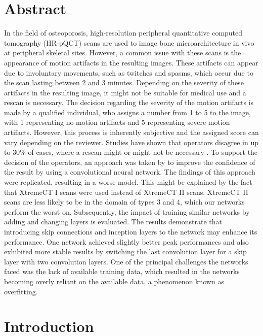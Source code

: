 \documentclass[
a4paper, 
12pt,
grayscalebody, %
abstract=on,
twoside, BCOR10mm, 12pt, DIV13,headinclude, footexclude, final, abstracton, openright
]{ibireprt}
\numberwithin{equation}{chapter}
\numberwithin{table}{chapter}
\numberwithin{figure}{chapter}
\numberwithin{algorithm}{chapter}
\numberwithin{example}{chapter}
\numberwithin{example}{chapter}
\begin{document}
\chapter*{Abstract}
In the field of osteoporosis, high-resolution peripheral quantitative computed tomography (HR-pQCT) scans are used to image bone microarchitecture in vivo at peripheral skeletal sites. However, a common issue with these scans is the appearance of motion artifacts in the resulting images. These artifacts can appear due to involuntary movements, such as twitches and spasms, which occur due to the scan lasting between 2 and 3 minutes. Depending on the severity of these artifacts in the resulting image, it might not be suitable for medical use and a rescan is necessary. The decision regarding the severity of the motion artifacts is made by a qualified individual, who assigns a number from 1 to 5 to the image, with 1 representing no motion artifacts and 5 representing severe motion artifacts. However, this process is inherently subjective and the assigned score can vary depending on the reviewer. Studies have shown that operators disagree in up to 30\% of cases, where a rescan might or might not be necessary \citet{Walle2023}. To support the decision of the operators, an approach was taken by \citet{Walle2023} to improve the confidence of the result by using a convolutional neural network. The findings of this approach were replicated, resulting in a worse model. This might be explained by the fact that XtremeCT I scans were used instead of XtremeCT II scans. XtremeCT II scans are less likely to be in the domain of types 3 and 4, which our networks perform the worst on. Subsequently, the impact of training similar networks by adding and changing layers is evaluated. The results demonstrate that introducing skip connections and inception layers to the network may enhance its performance. One network achieved slightly better peak performances and also exhibited more stable results by switching the last convolution layer for a skip layer with two convolution layers. One of the principal challenges the networks faced was the lack of available training data, which resulted in the networks becoming overly reliant on the available data, a phenomenon known as overfitting.  






	\chapter{Introduction}
\end{document}
